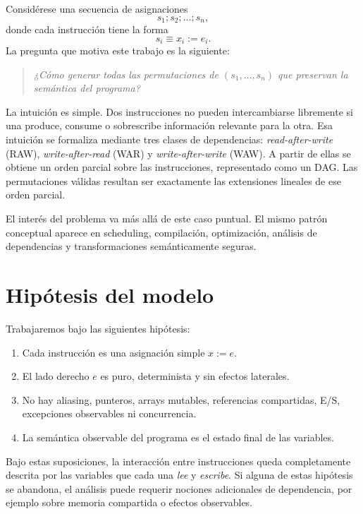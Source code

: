 \documentclass[letterpaper,oneside]{article}
\theoremstyle{remark}
\begin{document}
Considérese una secuencia de asignaciones
\[
  s_1; s_2; \dots; s_n,
\]
donde cada instrucción tiene la forma
\[
  s_i \equiv x_i := e_i.
\]
La pregunta que motiva este trabajo es la siguiente:

\begin{quote}
\emph{¿Cómo generar todas las permutaciones de $(s_1,\dots,s_n)$ que preservan la semántica del programa?}
\end{quote}

La intuición es simple. Dos instrucciones no pueden intercambiarse libremente si una produce, consume o sobrescribe información relevante para la otra. Esa intuición se formaliza mediante tres clases de dependencias: \emph{read-after-write} (RAW), \emph{write-after-read} (WAR) y \emph{write-after-write} (WAW). A partir de ellas se obtiene un orden parcial sobre las instrucciones, representado como un DAG. Las permutaciones válidas resultan ser exactamente las extensiones lineales de ese orden parcial.

El interés del problema va más allá de este caso puntual. El mismo patrón conceptual aparece en scheduling, compilación, optimización, análisis de dependencias y transformaciones semánticamente seguras.

\section{Hipótesis del modelo}

Trabajaremos bajo las siguientes hipótesis:
\begin{enumerate}[label=(H\arabic*),leftmargin=3.2em]
  \item Cada instrucción es una asignación simple $x := e$.
  \item El lado derecho $e$ es puro, determinista y sin efectos laterales.
  \item No hay aliasing, punteros, arrays mutables, referencias compartidas, E/S, excepciones observables ni concurrencia.
  \item La semántica observable del programa es el estado final de las variables.
\end{enumerate}

Bajo estas suposiciones, la interacción entre instrucciones queda completamente descrita por las variables que cada una \emph{lee} y \emph{escribe}. Si alguna de estas hipótesis se abandona, el análisis puede requerir nociones adicionales de dependencia, por ejemplo sobre memoria compartida o efectos observables.
\end{document}
